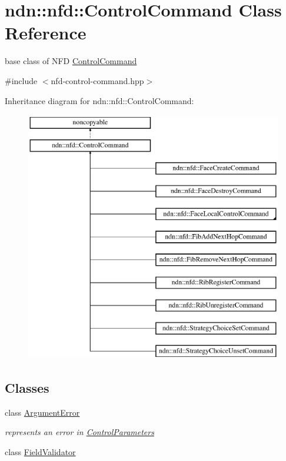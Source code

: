 \hypertarget{classndn_1_1nfd_1_1ControlCommand}{}\section{ndn\+:\+:nfd\+:\+:Control\+Command Class Reference}
\label{classndn_1_1nfd_1_1ControlCommand}


base class of N\+FD \hyperlink{classndn_1_1nfd_1_1ControlCommand}{Control\+Command}  




{\ttfamily \#include $<$nfd-\/control-\/command.\+hpp$>$}

Inheritance diagram for ndn\+:\+:nfd\+:\+:Control\+Command\+:\begin{figure}[H]
\begin{center}
\leavevmode
\includegraphics[height=11.000000cm]{classndn_1_1nfd_1_1ControlCommand}
\end{center}
\end{figure}
\subsection*{Classes}
\begin{DoxyCompactItemize}
\item 
class \hyperlink{classndn_1_1nfd_1_1ControlCommand_1_1ArgumentError}{Argument\+Error}
\begin{DoxyCompactList}\small\item\em represents an error in \hyperlink{classndn_1_1nfd_1_1ControlParameters}{Control\+Parameters} \end{DoxyCompactList}\item 
class \hyperlink{classndn_1_1nfd_1_1ControlCommand_1_1FieldValidator}{Field\+Validator}
\end{DoxyCompactItemize}
